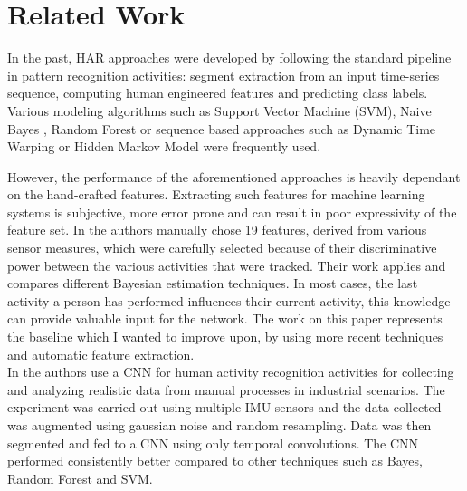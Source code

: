 
\section{Related Work}
\label{sec:related_work}

In the past, HAR approaches were developed by following the standard pipeline in pattern recognition activities: segment extraction from an input time-series sequence, computing human engineered features and predicting class labels. Various modeling algorithms such as Support Vector Machine (SVM), Naive Bayes \cite{base-paper}, Random Forest or sequence based approaches such as Dynamic Time Warping \cite{Daniel-2015} or Hidden Markov Model \cite{Andreas-2014, Francisco-2014} were frequently used.

However, the performance of the aforementioned approaches is heavily dependant on the hand-crafted features. Extracting such features for machine learning systems is subjective, more error prone and can result in poor expressivity of the feature set.
In \cite{base-paper} the authors manually chose 19 features, derived from various sensor measures, which were carefully selected because of their discriminative power between the various activities that were tracked. Their work applies and compares different Bayesian estimation techniques. In most cases, the last activity a person has performed influences their current activity, this knowledge can provide valuable input for the network. The work on this paper represents the baseline which I wanted to improve upon, by using more recent techniques and automatic feature extraction.\\
In \cite{Grzezick-2017} the authors use a CNN for human activity recognition activities for collecting and analyzing realistic data from manual processes in industrial scenarios. The experiment was carried out using multiple IMU sensors and the data collected was augmented using gaussian noise and random resampling. Data was then segmented and fed to a CNN using only temporal convolutions. The CNN performed consistently better compared to other techniques such as Bayes, Random Forest and SVM.\\
